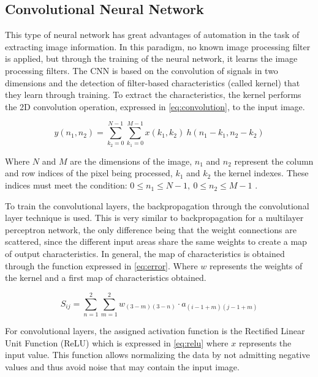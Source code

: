 \documentclass{cys}
\begin{document}
\subsection{Convolutional Neural Network}
This type of neural network has great advantages of automation in the task of extracting image information. In this paradigm, no known image processing filter is applied, but through the training of the neural network, it learns the image processing filters. The CNN is based on the convolution of signals in two dimensions and the detection of filter-based characteristics (called kernel) that they learn through training. To extract the characteristics, the kernel performs the 2D convolution operation, expressed in \ref{eq:convolution}, to the input image. 

\begin{equation}
y(n_1, n_2) = \sum_{k_2=0}^{N-1} \sum_{k_1=0}^{M-1} x(k_1, k_2)\ h(n_1 - k_1, n_2 - k_2)
\label{eq:convolution}
\end{equation}

Where $N$ and $M$ are the dimensions of the image, $n_1$ and $n_2$ represent the column and row indices of the pixel being processed, $k_1$ and $k_2$ the kernel indexes. These indices must meet the condition: $0 \leq n_1 \leq N-1,\ 0 \leq n_2 \leq M - 1$ \cite{pattanayak2017pro}.


To train the convolutional layers, the backpropagation through the convolutional layer technique is used. This is very similar to backpropagation for a multilayer perceptron network, the only difference being that the weight connections are scattered, since the different input areas share the same weights to create a map of output characteristics. In general, the map of characteristics is obtained through the function expressed in \ref{eq:error}. Where $w$ represents the weights of the kernel and a first map of characteristics obtained.

\begin{equation}
S_{ij} = \sum_{n=1}^{2} \sum_{m=1}^{2} w_{(3-m)(3-n)} \cdot a_{(i-1+m)(j-1+m)}
\label{eq:error}
\end{equation}

For convolutional layers, the assigned activation function is the Rectified Linear Unit Function (ReLU) which is expressed in \ref{eq:relu} where $x$ represents the input value. This function allows normalizing the data by not admitting negative values and thus avoid noise that may contain the input image.
\end{document}

